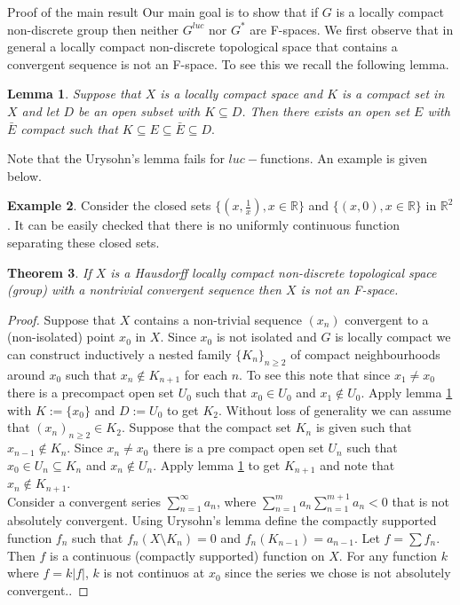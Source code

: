 \documentclass[12pt,a4paper]{amsart}
\theoremstyle{plain}
\newtheorem{theorem}{Theorem}[section]
\newtheorem{lemma}[theorem]{Lemma}
\theoremstyle{definition}
\newtheorem{example}[theorem]{Example}
\begin{document}
\begin{section}{Proof of the main result} Our main goal is to show that if $G$ is a locally compact non-discrete group then neither $G^{luc}$ nor $G^*$ are F-spaces. We first observe that in general a locally compact non-discrete topological space that contains a convergent sequence is not an F-space. To see this we recall the following lemma.

\begin{lemma}\label{topol}
Suppose that $X$ is a locally compact space and $K$ is a compact set in $X$ and  let $D$ be an open subset with $K\subseteq D$. Then there exists an open set $E$ with $\bar{E}$ compact such that $K\subseteq E\subseteq \bar{E}\subseteq D.$
\end{lemma}

Note that  the Urysohn's lemma fails for $luc-$functions. An example is given below. 
\begin{example}
Consider the closed sets $\{(x,\frac{1}{x}),x\in\mathbb{R}\}$ and $\{(x,0),x\in\mathbb{R}\}$ in $\mathbb{R}^2$. It can be easily checked that there is no uniformly continuous function separating these closed sets.
\end{example}

\begin{theorem}
If $X$ is a Hausdorff locally compact non-discrete topological space (group)  with a nontrivial convergent sequence then $X$ is not an F-space.
\end{theorem}
\begin{proof}
Suppose that $X$ contains a non-trivial sequence $(x_n)$ convergent to a (non-isolated) point  $x_0$ in $X$. Since $x_0$ is not isolated and $G$ is locally compact we can construct inductively a nested family $\{K_n\}_{n\geq 2}$ of compact neighbourhoods around $x_0$ such that $x_n\notin K_{n+1}$ for each $n$. To see this note that since $x_1\neq x_0$ there is a precompact open set $U_0$ such that $x_0\in U_0$ and $x_1\not\in U_0$. Apply lemma \ref{topol} with $K:=\{x_0\}$ and $D:=U_0$ to get $K_2$. Without loss of generality we can assume that $(x_n)_{n\geq 2}\in K_2$. Suppose that the compact set $K_n$ is given such that $x_{n-1}\not\in K_n$. Since $x_n\neq x_0$ there is a pre compact open set $U_n$ such that $x_0\in U_n\subseteq K_n$ and $x_n\not\in U_n$.  Apply lemma \ref{topol} to get $K_{n+1}$ and note that $x_n\not\in K_{n+1}$.\\
 Consider a convergent series $\sum_{n=1}^{\infty}a_n$, where $\sum_{n=1}^m a_n\sum_{n=1}^{m+1} a_{n}<0$ that is not absolutely convergent. Using Urysohn's lemma define the compactly supported function $f_n$ such that  $f_n(X\setminus K_n)=0$ and $f_n(K_{n-1})=a_{n-1}$. Let $f=\sum f_n$. Then $f$ is a continuous (compactly supported) function on $X$. For any function $k$ where $f=k |f|$, $k$ is not continuos at $x_0$ since the series we chose is not absolutely convergent..  
\end{proof}


\end{section}
\end{document}
